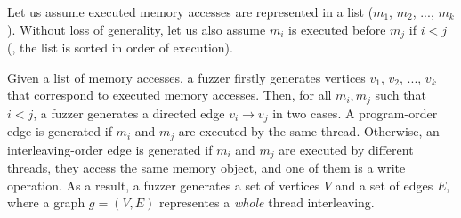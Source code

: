 %


%



%
Let us assume executed memory accesses are represented in a list
($m_1$, $m_2$, ..., $m_k$). Without loss of generality, let us also
assume $m_i$ is executed before $m_j$ if $i<j$ (\ie, the list is
sorted in order of execution).

Given a list of memory accesses, a fuzzer firstly generates vertices
$v_1$, $v_2$, ..., $v_k$ that correspond to executed memory accesses.
%
Then, for all $m_i, m_j$ such that $i<j$, a fuzzer generates a
directed edge $v_i \rightarrow v_j$ in two cases. A program-order edge
is generated if $m_i$ and $m_j$ are executed by the same thread.
%
Otherwise, an interleaving-order edge is generated if $m_i$ and $m_j$
are executed by different threads, they access the same memory object,
and one of them is a write operation.
%
As a result, a fuzzer generates a set of vertices $V$ and a set of
edges $E$, where a graph $g = (V, E)$ representes a \textit{whole}
thread interleaving.


